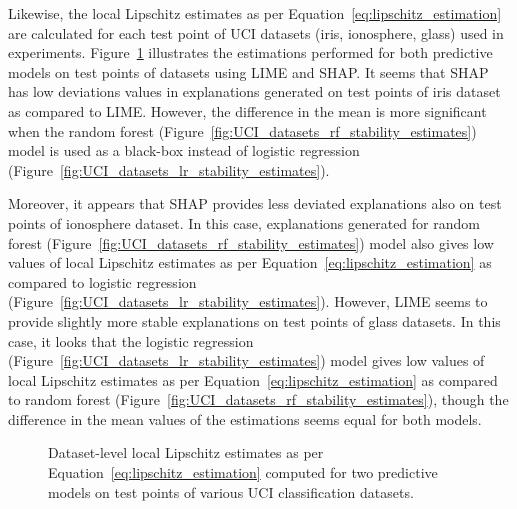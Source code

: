 \documentclass[english]{tktltiki2}
\theoremstyle{definition}
\theoremstyle{remark}
\begin{document}
Likewise, the local Lipschitz estimates as per Equation~\eqref{eq:lipschitz_estimation} are calculated for each test point of UCI datasets (iris, ionosphere, glass) used in experiments. Figure~\ref{fig:UCI_datasets_stability_estimates} illustrates the estimations performed for both predictive models on test points of datasets using LIME and SHAP. It seems that SHAP has low deviations values in explanations generated on test points of iris dataset as compared to LIME. However, the difference in the mean is more significant when the random forest (Figure~\ref{fig:UCI_datasets_rf_stability_estimates}) model is used as a black-box instead of logistic regression (Figure~\ref{fig:UCI_datasets_lr_stability_estimates}).

Moreover, it appears that SHAP provides less deviated explanations also on test points of ionosphere dataset. In this case, explanations generated for random forest (Figure~\ref{fig:UCI_datasets_rf_stability_estimates}) model also gives low values of local Lipschitz estimates as per Equation~\eqref{eq:lipschitz_estimation} as compared to logistic regression (Figure~\ref{fig:UCI_datasets_lr_stability_estimates}). However, LIME seems to provide slightly more stable explanations on test points of glass datasets. In this case, it looks that the logistic regression (Figure~\ref{fig:UCI_datasets_lr_stability_estimates}) model gives low values of local Lipschitz estimates as per Equation~\eqref{eq:lipschitz_estimation} as compared to random forest (Figure~\ref{fig:UCI_datasets_rf_stability_estimates}), though the difference in the mean values of the estimations seems equal for both models.

\begin{figure}[H]
	\hspace*{\fill}%
	\caption{Dataset-level local Lipschitz estimates as per Equation~\eqref{eq:lipschitz_estimation} computed for two predictive models on test points of various UCI classification datasets.}%
	\label{fig:UCI_datasets_stability_estimates}%
\end{figure}
\end{document}
